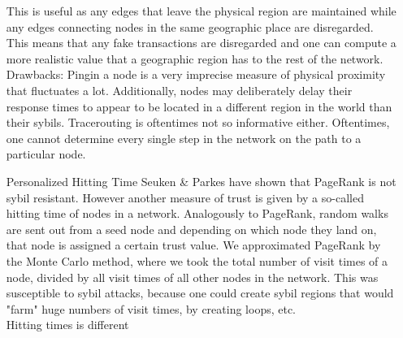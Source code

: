 \documentclass[11pt,a4paper]{article}
\theoremstyle{definition}
\theoremstyle{theorem}
\theoremstyle{proposition}
\theoremstyle{corollary}
\theoremstyle{lemma}
\theoremstyle{example}
\theoremstyle{remark}
\begin{document}
\begin{enumerate}
\noindent{}This is useful as any edges that leave the physical region are maintained while any edges connecting nodes in the same geographic place are disregarded. This means that any fake transactions are disregarded and one can compute a more realistic value that a geographic region has to the rest of the network. \vspace{1em}\\

\noindent{}Drawbacks: Pingin a node is a very imprecise measure of physical proximity that fluctuates a lot. Additionally, nodes may deliberately delay their response times to appear to be located in a different region in the world than their sybils. Tracerouting is oftentimes not so informative either. Oftentimes, one cannot determine every single step in the network on the path to a particular node.\vspace{1em}\\

\item[Personalized Hitting Time]Seuken \& Parkes have shown that PageRank is not sybil resistant. However another measure of trust is given by a so-called hitting time of nodes in a network. Analogously to PageRank, random walks are sent out from a seed node and depending on which node they land on, that node is assigned a certain trust value. We approximated PageRank by the Monte Carlo method, where we took the total number of visit times of a node, divided by all visit times of all other nodes in the network. This was susceptible to sybil attacks, because one could create sybil regions that would "farm" huge numbers of visit times, by creating loops, etc. \vspace{1em}\\

\noindent{}Hitting times is different 
\end{enumerate}
\end{document}
